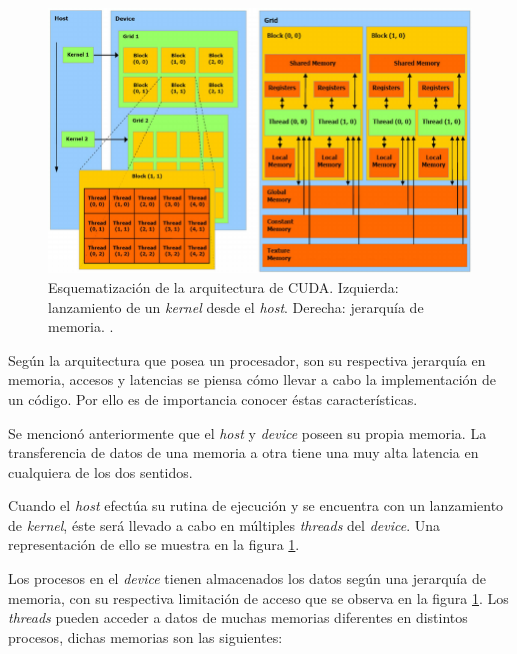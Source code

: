 \begin{figure}[h!]
	\centering
	\includegraphics[width=\textwidth]{figs/cap3/Schematization-of-CUDA-architecture-Schematic-representation-of-CUDA-threads-and-memory.png}
	\caption{Esquematización de la arquitectura de CUDA. Izquierda: lanzamiento de un \textit{kernel} desde el \textit{host}. Derecha: jerarquía de memoria.  \cite{nobile2014cutauleaping}.}
	\label{fig:schedule_architecture_cuda}
\end{figure}

Según la arquitectura que posea un procesador, son su respectiva jerarquía en memoria, accesos y latencias se piensa cómo llevar a cabo la implementación de un código. Por ello es de importancia conocer éstas características. 

Se mencionó anteriormente que el \textit{host} y \textit{device} poseen su propia memoria. La transferencia de datos de una memoria a otra tiene una muy alta latencia en cualquiera de los dos sentidos. 


Cuando el \textit{host} efectúa su rutina de ejecución y se encuentra con un lanzamiento de \textit{kernel}, éste será llevado a cabo en múltiples \textit{threads} del \textit{device}. Una representación de ello se muestra en la figura \ref{fig:schedule_architecture_cuda}. 

Los procesos en el \textit{device} tienen almacenados los datos según una jerarquía de memoria, con su respectiva limitación de acceso que se observa en la figura \ref{fig:schedule_architecture_cuda}. Los \textit{threads} pueden acceder a datos de muchas memorias diferentes en distintos procesos, dichas memorias son las siguientes:

